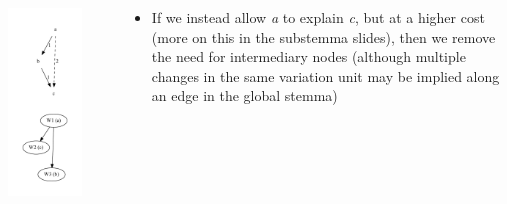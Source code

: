 \documentclass[10pt]{beamer}
\begin{document}
	\begin{frame}
		\begin{columns}
			\begin{column}{0.4\textwidth}
				\centering
				\includegraphics[width=0.75\textwidth]{../img/transitivity-example.pdf}
			\end{column}
			\begin{column}{0.55\textwidth}
				\begin{itemize}
					\item If we instead allow \emph{a} to explain \emph{c}, but at a higher cost (more on this in the substemma slides), then we remove the need for intermediary nodes (although multiple changes in the same variation unit may be implied along an edge in the global stemma)
				\end{itemize}
			\end{column}
		\end{columns}
	\end{frame}
\end{document}
